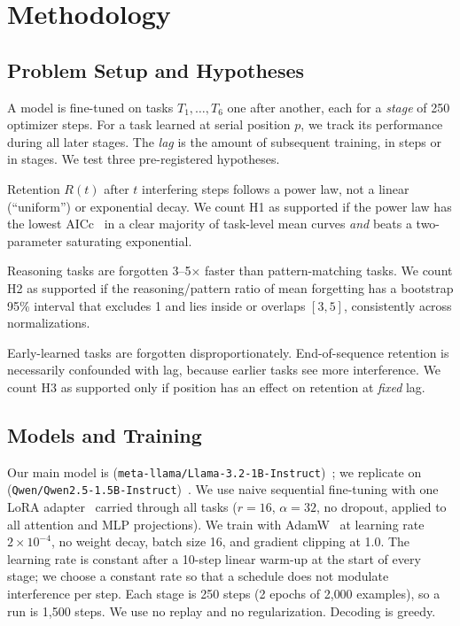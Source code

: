 \section{Methodology}
\label{sec:method}

\subsection{Problem Setup and Hypotheses}

A model is fine-tuned on tasks $T_1, \dots, T_6$ one after another, each for a \emph{stage} of 250 optimizer steps.
For a task learned at serial position $p$, we track its performance during all later stages.
The \emph{lag} is the amount of subsequent training, in steps or in stages.
We test three pre-registered hypotheses.

 Retention $R(t)$ after $t$ interfering steps follows a power law, not a linear (``uniform'') or exponential decay.
We count H1 as supported if the power law has the lowest AICc~\cite{hurvich1989regression} in a clear majority of task-level mean curves \emph{and} beats a two-parameter saturating exponential.

 Reasoning tasks are forgotten 3--5$\times$ faster than pattern-matching tasks.
We count H2 as supported if the reasoning/pattern ratio of mean forgetting has a bootstrap 95\% interval that excludes 1 and lies inside or overlaps $[3, 5]$, consistently across normalizations.

 Early-learned tasks are forgotten disproportionately.
End-of-sequence retention is necessarily confounded with lag, because earlier tasks see more interference.
We count H3 as supported only if position has an effect on retention at \emph{fixed} lag.

\subsection{Models and Training}

Our main model is \llama (\texttt{meta-llama/Llama-3.2-1B-Instruct})~\cite{meta2024llama32}; we replicate on \qwen (\texttt{Qwen/Qwen2.5-1.5B-Instruct})~\cite{qwen2024qwen25}.
We use naive sequential fine-tuning with one LoRA adapter~\cite{hu2022lora} carried through all tasks ($r{=}16$, $\alpha{=}32$, no dropout, applied to all attention and MLP projections).
We train with AdamW~\cite{loshchilov2019decoupled} at learning rate $2\times10^{-4}$, no weight decay, batch size 16, and gradient clipping at 1.0.
The learning rate is constant after a 10-step linear warm-up at the start of every stage; we choose a constant rate so that a schedule does not modulate interference per step.
Each stage is 250 steps (2 epochs of 2{,}000 examples), so a run is 1{,}500 steps.
We use no replay and no regularization.
Decoding is greedy.

